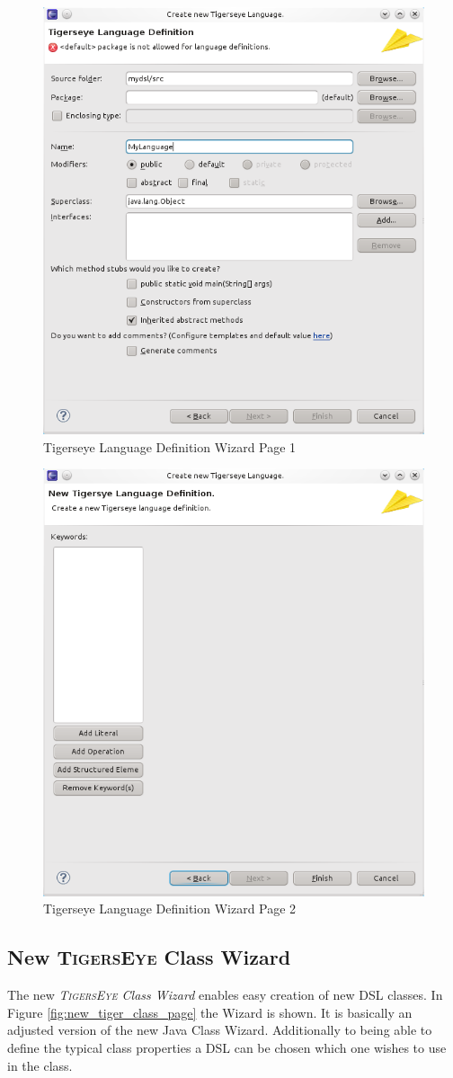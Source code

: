 \documentclass[article,colorback,accentcolor=tud4c]{tudreport}
\newcommand\tiger{%
  \textsc{TigersEye}
}
\begin{document}
	\begin{figure}
	  \centering
	  \includegraphics[width=.5\textwidth,keepaspectratio=true]{./pics/tigerseye_language_definition_page1.png}
	  \caption{Tigerseye Language Definition Wizard Page 1}
	  \label{fig:tiger_lang_definition_page1}
	\end{figure}
	
	\begin{figure}
	  \centering
	  \includegraphics[width=.5\textwidth,keepaspectratio=true]{./pics/tigerseye_language_definition_page2.png}
	  \caption{Tigerseye Language Definition Wizard Page 2}
	  \label{fig:tiger_lang_definition_page2}
	\end{figure}
	
	\subsection{New \tiger Class Wizard}
	  The new \emph{\tiger Class Wizard} enables easy creation of new DSL classes. In Figure \ref{fig:new_tiger_class_page} the Wizard is shown. It is basically an adjusted version of the new Java Class Wizard. Additionally to being able to define the typical class properties a DSL can be chosen which one wishes to use in the class.
\end{document}
